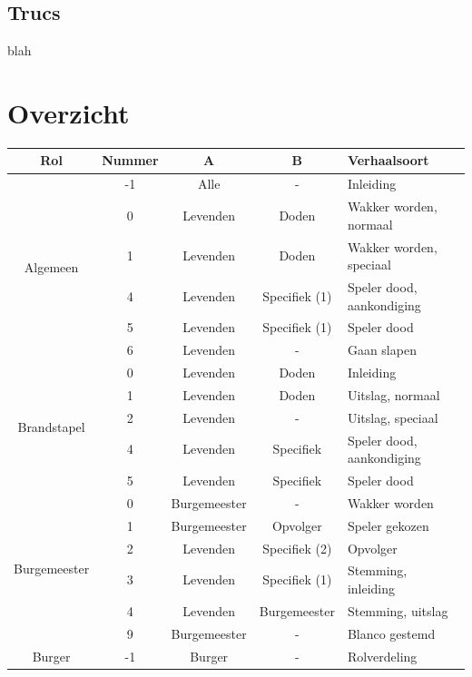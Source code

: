 \documentclass[12pt]{article}
\begin{document}
  \subsection{Trucs}
    
      blah

\newpage

\section{Overzicht}

  \begin{center}
    \begin{longtable}{c|c|c|c|l}
      Rol & Nummer & A & B &Verhaalsoort \\
      \hline
      \hline
      \multirow{6}{*}{Algemeen} & -1 & Alle & - & Inleiding \\
       & 0 & Levenden & Doden & Wakker worden, normaal \\
       & 1 & Levenden & Doden & Wakker worden, speciaal \\
       & 4 & Levenden & Specifiek (1) & Speler dood, aankondiging \\
       & 5 & Levenden & Specifiek (1) & Speler dood \\
       & 6 & Levenden & - & Gaan slapen \\
      \hline
      \multirow{5}{*}{Brandstapel} & 0 & Levenden & Doden & Inleiding \\
       & 1 & Levenden & Doden & Uitslag, normaal \\
       & 2 & Levenden & - & Uitslag, speciaal \\
       & 4 & Levenden & Specifiek & Speler dood, aankondiging \\
       & 5 & Levenden & Specifiek & Speler dood \\
      \hline
      \multirow{6}{*}{Burgemeester} & 0 & Burgemeester & - & Wakker worden \\
       & 1 & Burgemeester & Opvolger & Speler gekozen \\
       & 2 & Levenden & Specifiek (2) & Opvolger \\
       & 3 & Levenden & Specifiek (1) & Stemming, inleiding \\
       & 4 & Levenden & Burgemeester & Stemming, uitslag \\
       & 9 & Burgemeester & - & Blanco gestemd \\
      \hline
      \multirow{1}{*}{Burger} & -1 & Burger & - & Rolverdeling \\

\end{longtable}
\end{center}
\end{document}
